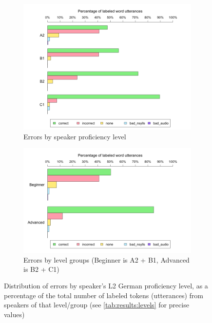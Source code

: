 			
			\begin{figure}[tbp]
				\centering
				
				\begin{subfigure}{\textwidth}
					\centering
					\includegraphics[width=\textwidth]{img/plots/judgments4Levels}
					\caption{Errors by speaker proficiency level}
					\label{fig:levelbars:4}
				\end{subfigure}

				\vspace{2em}				
				
				\begin{subfigure}{\textwidth}
					\centering
					\includegraphics[width=\textwidth]{img/plots/judgmentsLevelGroups}
					\caption{Errors by level groups (Beginner is A2 + B1, Advanced is B2 + C1)}
					\label{fig:levelbars:groups}
				\end{subfigure}
				
				\vspace{1.5em}				
				
				\caption[Error distribution by proficiency level]{Distribution of errors by speaker's L2 German proficiency level,
				as a percentage of the total number of labeled tokens (utterances) from speakers of that level/group 
				(see \cref{tab:results:levels} for precise values)
				}
				\label{fig:levelbars}
			\end{figure}
			
